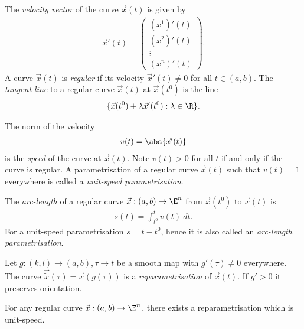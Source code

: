 \documentclass{article}
\begin{document}
\begin{definition}
    The \emph{velocity vector} of the curve $\vec x(t)$ is given by
    \begin{align*}
        \vec x'(t) = \begin{pmatrix}
            (x^1)'(t)\\
            (x^2)'(t)\\
            \vdots\\
            (x^n)'(t)
        \end{pmatrix}.
    \end{align*}
    A curve $\vec x(t)$ is \emph{regular} if its velocity $\vec x'(t)\not=0$
    for all $t\in(a,b)$. The \emph{tangent line} to a regular curve $\vec x(t)$
    at $\vec x(t^0)$ is the line 
    \begin{align*}
        \{\vec x(t^0)+\lambda\vec x'(t^0) : \lambda \in\R\}.
    \end{align*}
\end{definition}

\begin{definition}
    The norm of the velocity
    \begin{align*}
        v(t)=\abs{\vec x'(t)}
    \end{align*}
    is the \emph{speed} of the curve at $\vec x(t)$. Note $v(t)>0$ for all $t$
    if and only if the curve is regular. A parametrisation of a regular curve $\vec x(t)$
    such that $v(t)=1$ everywhere is called a \emph{unit-speed parametrisation}.
\end{definition}

\begin{definition}
    The \emph{arc-length} of a regular curve $\vec x:(a,b)\to \E^n$ from $\vec x(t^0)$
    to $\vec x(t)$ is
    \begin{align*}
        s(t) = \int_{t^0}^t v(t)\:dt.
    \end{align*}
    For a unit-speed parametrisation $s=t-t^0$, hence it is also called an
    \emph{arc-length parametrisation}.
\end{definition}

\begin{definition}
    Let $g:(k,l)\to(a,b), \tau\to t$ be a smooth map with $g'(\tau)\not=0$ everywhere.
    The curve $\vec{\tilde x}(\tau)=\vec x(g(\tau))$ is a \emph{reparametrisation}
    of $\vec x(t)$. If $g'>0$ it preserves orientation.
\end{definition}

\begin{theorem}
    For any regular curve $\vec x:(a,b)\to\E^n$, there exists a reparametrisation
    which is unit-speed.
\end{theorem}
\end{document}
